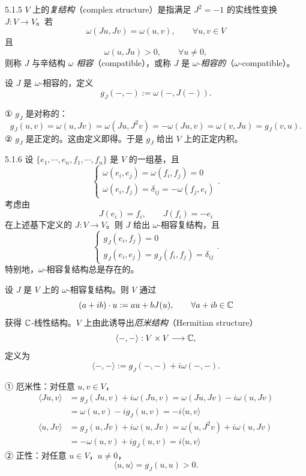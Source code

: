 \begin{definition}{5.1.5}
$V$ 上的\emph{复结构}（complex structure）是指满足 $J^2=-1$ 的实线性变换 $J:V\to V$。若
\[
\omega(Ju,Jv)=\omega(u,v),\qquad \forall u,v\in V
\]
且
\[
\omega(u,Ju)>0,\qquad \forall u\neq 0,
\]
则称 $J$ 与辛结构 $\omega$ \emph{相容}（compatible），或称 $J$ 是 $\omega$-\emph{相容的}（$\omega$-compatible）。
\end{definition}

设 $J$ 是 $\omega$-相容的，定义
\[
g_J(-,-):=\omega(-,J(-)).
\]


① $g_J$ 是对称的：
\[
g_J(u,v)=\omega(u,Jv)=\omega(Ju,J^2v)=-\omega(Ju,v)=\omega(v,Ju)=g_J(v,u).
\]
② $g_J$ 是正定的。这由定义即得。于是 $g_J$ 给出 $V$ 上的正定内积。

\begin{example}{5.1.6}
设 $\{e_1,\cdots,e_n,f_1,\cdots,f_n\}$ 是 $V$ 的一组基，且
\[
\begin{cases}
\omega(e_i,e_j)=\omega(f_i,f_j)=0\\[2pt]
\omega(e_i,f_j)=\delta_{ij}=-\omega(f_j,e_i)
\end{cases}.
\]
考虑由
\[
J(e_i)=f_i,\qquad J(f_i)=-e_i
\]
在上述基下定义的 $J:V\to V$。则 $J$ 给出 $\omega$-相容复结构，且
\[
\begin{cases}
g_J(e_i,f_j)=0\\[2pt]
g_J(e_i,e_j)=g_J(f_i,f_j)=\delta_{ij}
\end{cases}.
\]
特别地，$\omega$-相容复结构总是存在的。
\end{example}

设 $J$ 是 $V$ 上的 $\omega$-相容复结构。则 $V$ 通过
\[
(a+ib)\cdot u:=au+bJ(u),\qquad \forall a+ib\in\mathbb{C}
\]
获得 $\mathbb{C}$-线性结构。$V$ 上由此诱导出\emph{厄米结构}（Hermitian structure）
\[
\langle-,-\rangle:V\times V\longrightarrow\mathbb{C},
\]
定义为
\[
\langle-,-\rangle:=g_J(-,-)+i\omega(-,-).
\]

① 厄米性：对任意 $u,v\in V$，
\begin{align*}
\langle Ju,v\rangle&=g_J(Ju,v)+i\omega(Ju,v)=\omega(Ju,Jv)-i\omega(u,Jv)\\
&=\omega(u,v)-ig_J(u,v)=-i\langle u,v\rangle\\
\langle u,Jv\rangle&=g_J(u,Jv)+i\omega(u,Jv)=\omega(u,J^2v)+i\omega(u,Jv)\\
&=-\omega(u,v)+ig_J(u,v)=i\langle u,v\rangle
\end{align*}
② 正性：对任意 $u\in V$，$u\neq 0$，
\[
\langle u,u\rangle=g_J(u,u)>0.
\]

